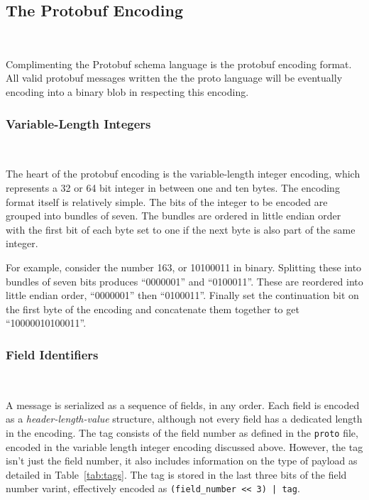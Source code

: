 \documentclass[11pt]{article}
\theoremstyle{definition}
\theoremstyle{plain}
\begin{document}
\subsection{The Protobuf Encoding}~\label{sec:proto-enc}

Complimenting the Protobuf schema language is the protobuf encoding format. All
valid protobuf messages written the the proto language will be eventually
encoding into a binary blob in respecting this encoding.

\subsubsection{Variable-Length Integers}~\label{sec:proto-vint}

The heart of the protobuf encoding is the variable-length integer encoding,
which represents a 32 or 64 bit integer in between one and ten bytes. The
encoding format itself is relatively simple. The bits of the integer to be
encoded are grouped into bundles of seven. The bundles are ordered in little
endian order with the first bit of each byte set to one if the next byte is also
part of the same integer.

For example, consider the number 163, or 10100011 in binary. Splitting these
into bundles of seven bits produces ``0000001'' and ``0100011''. These are
reordered into little endian order, ``0000001'' then ``0100011''. Finally set
the continuation bit on the first byte of the encoding and concatenate them
together to get ``10000010100011''.

\subsubsection{Field Identifiers}~\label{sec:proto-header}

A message is serialized as a sequence of fields, in any order. Each field is
encoded as a \emph{header-length-value} structure, although not every field has a
dedicated length in the encoding. The tag consists of the field number as
defined in the \texttt{proto} file, encoded in the variable length integer
encoding discussed above. However, the tag isn't just the field number, it also
includes information on the type of payload as detailed in
Table~\ref{tab:tags}. The tag is stored in the last three bits of the
field number varint, effectively encoded as \texttt{(field\_number << 3) | tag}.
\end{document}
